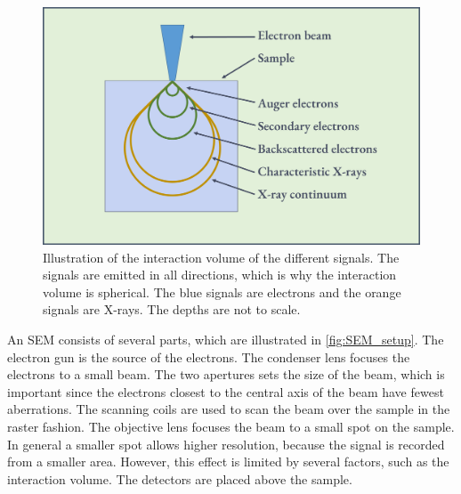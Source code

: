 \begin{figure}[ht]
    \centering
    \includegraphics[width=0.8\linewidth]{figures/interaction_volume.png}
    \caption{
        Illustration of the interaction volume of the different signals.
        The signals are emitted in all directions, which is why the interaction volume is spherical.
        The blue signals are electrons and the orange signals are X-rays.
        The depths are not to scale.
    }
    \label{fig:interaction_volume}
\end{figure}




An SEM consists of several parts, which are illustrated in \cref{fig:SEM_setup}.
The electron gun is the source of the electrons.
The condenser lens focuses the electrons to a small beam.
The two apertures sets the size of the beam, which is important since the electrons closest to the central axis of the beam have fewest aberrations.
The scanning coils are used to scan the beam over the sample in the raster fashion.
The objective lens focuses the beam to a small spot on the sample.
In general a smaller spot allows higher resolution, because the signal is recorded from a smaller area.
However, this effect is limited by several factors, such as the interaction volume.
The detectors are placed above the sample.



